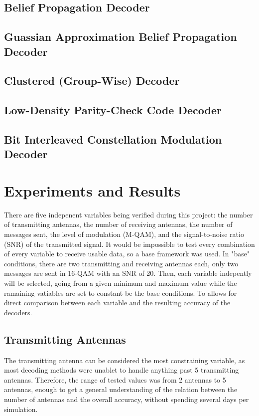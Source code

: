 \documentclass[conference]{IEEEtran}
\begin{document}
\subsection{Belief Propagation Decoder}

\subsection{Guassian Approximation Belief Propagation Decoder}

\subsection{Clustered (Group-Wise) Decoder}

\subsection{Low-Density Parity-Check Code Decoder}

\subsection{Bit Interleaved Constellation Modulation Decoder}

\section{Experiments and Results}
There are five indepenent variables being verified during this project: the number of transmitting antennas, the number of receiving antennas, the number of messages sent, the level of modulation (M-QAM), and the signal-to-noise ratio (SNR) of the transmitted signal. It would be impossible to test every combination of every variable to receive usable data, so a base framework was used. In "base" conditions, there are two transmitting and receiving antennas each, only two messages are sent in 16-QAM with an SNR of 20. Then, each variable indepently will be selected, going from a given minimum and maximum value while the ramaining vatiables are set to constant be the base conditions. To allows for direct comparison between each variable and the resulting accuracy of the decoders.

\subsection{Transmitting Antennas}
The transmitting antenna can be considered the most constraining variable, as most decoding methods were unablet to handle anything past 5 transmitting antennas. Therefore, the range of tested values was from 2 antennas to 5 antennas, enough to get a general understanding of the relation between the number of antennas and the overall accuracy, without spending several days per simulation.
\end{document}
